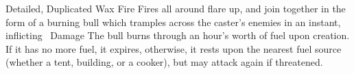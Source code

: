   {Detailed, Duplicated}%
  {Wax}%
  {Fire}%
  {}%
  {Fires all around flare up, and join together in the form of a burning bull which tramples across the caster's enemies in an instant, inflicting \showDam\ Damage}%
  {
  The bull burns through an hour's worth of fuel upon creation.
  If it has no more fuel, it expires, otherwise, it rests upon the nearest fuel source (whether a tent, building, or a cooker), but may attack again if threatened.}

